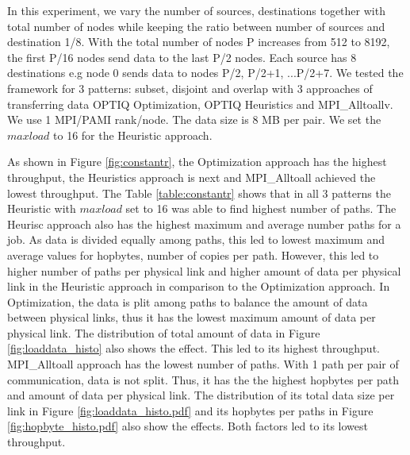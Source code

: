 In this experiment, we vary the number of sources, destinations together with total number of nodes while keeping the ratio between number of sources and destination 1/8. With the total number of nodes P  increases from 512 to 8192, the first P/16 nodes send data to the last P/2 nodes. Each source has 8 destinations e.g node 0 sends data to nodes P/2, P/2+1, ...P/2+7. We tested the framework for 3 patterns: subset, disjoint and overlap with 3 approaches of transferring data OPTIQ Optimization, OPTIQ Heuristics and MPI\_Alltoallv. We use 1 MPI/PAMI rank/node. The data size is 8 MB per pair. We set the $maxload$ to 16 for the Heuristic approach.

As shown in Figure \ref{fig:constantr}, the Optimization approach has the highest throughput, the Heuristics approach is next and MPI\_Alltoall achieved the lowest throughput. The Table \ref{table:constantr} shows that in all 3 patterns the Heuristic with $maxload$ set to 16 was able to find highest number of paths. The Heurisc approach also has the highest maximum and average number paths for a job. As data is divided equally among paths, this led to lowest maximum and average values for hopbytes, number of copies per path. However, this led to higher number of paths per physical link and higher amount of data per physical link in the Heuristic approach in comparison to the Optimization approach. In Optimization, the data is plit among paths to balance the amount of data between physical links, thus it has the lowest maximum amount of data per physical link. The distribution of total amount of data in Figure \ref{fig:loaddata_histo} also shows the effect. This led to its highest throughput. MPI\_Alltoall approach has the lowest number of paths. With 1 path per pair of communication, data is not split. Thus, it has the the highest hopbytes per path and amount of data per physical link. The distribution of its total data size per link in Figure \ref{fig:loaddata_histo.pdf} and its hopbytes per paths in Figure \ref{fig:hopbyte_histo.pdf} also show the effects. Both factors led to its lowest throughput.
